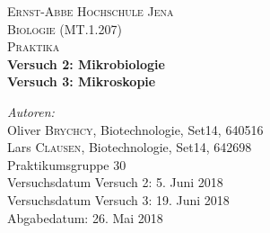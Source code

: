 \begin{titlepage}
		
		
	\center %
		 
		
	\textsc{\LARGE Ernst-Abbe Hochschule Jena}\\[3em] %
	\textsc{\Large Biologie (MT.1.207)}\\[0.5cm] %
	\textsc{\large Praktika}\\[0.5cm] %
		
		
	\HRule 
	\vspace{0.8cm}
	{ \huge \bfseries Versuch 2: Mikrobiologie}\\[0.4cm]
	{ \huge \bfseries Versuch 3: Mikroskopie}\\[0.5cm]
	\HRule %
		 
		
		
	\begin{flushleft} \large
		\emph{Autoren:}\\
		Oliver \textsc{Brychcy}, Biotechnologie, Set14, 640516 \\ %
		Lars \textsc{Clausen}, Biotechnologie, Set14, 642698 \\ %
		Praktikumsgruppe 30\\[1em]
				
		{Versuchsdatum Versuch 2: \large 5. Juni 2018}\\
		{Versuchsdatum Versuch 3: \large 19. Juni 2018}\\
		{Abgabedatum: \large 26. Mai 2018}\\
				

\end{flushleft}
\end{titlepage}
